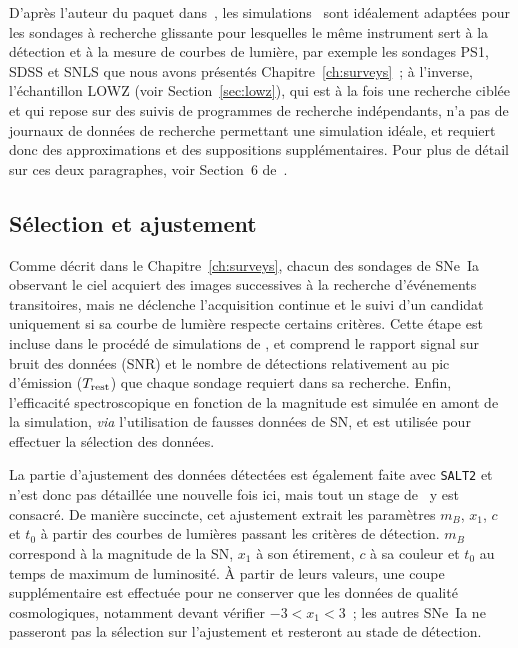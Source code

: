 \documentclass[../main/main.tex]{subfiles}
\begin{document}
D'après l'auteur du paquet dans~\cite{kessler2019}, les simulations \snana\ sont
idéalement adaptées pour les sondages à recherche glissante pour lesquelles le
même instrument sert à la détection et à la mesure de courbes de lumière, par
exemple les sondages PS1, SDSS et SNLS que nous avons présentés
Chapitre~\ref{ch:surveys}~; à l'inverse, l'échantillon LOWZ (voir
Section~\ref{sec:lowz}), qui est à la fois une recherche ciblée et qui repose
sur des suivis de programmes de recherche indépendants, n'a pas de journaux de
données de recherche permettant une simulation idéale, et requiert donc des
approximations et des suppositions supplémentaires. Pour plus de détail sur ces
deux paragraphes, voir Section~6 de~\cite{kessler2019}.

\subsection{Sélection et ajustement}\label{ssec:simdetec}

Comme décrit dans le Chapitre~\ref{ch:surveys}, chacun des sondages de SNe~Ia
observant le ciel acquiert des images successives à la recherche d'événements
transitoires, mais ne déclenche l'acquisition continue et le suivi d'un candidat
uniquement si sa courbe de lumière respecte certains critères. Cette étape est
incluse dans le procédé de simulations de \snana, et comprend le rapport signal
sur bruit des données (SNR) et le nombre de détections relativement au pic
d'émission ($T_{\rm rest}$) que chaque sondage requiert dans sa recherche.
Enfin, l'efficacité spectroscopique en fonction de la magnitude est simulée en
amont de la simulation, \textit{via} l'utilisation de fausses données de SN, et
est utilisée pour effectuer la sélection des données.

La partie d'ajustement des données détectées est également faite avec
\texttt{SALT2} et n'est donc pas détaillée une nouvelle fois ici, mais tout un
stage de \snana\ y est consacré. De manière succincte, cet ajustement extrait
les paramètres $m_B$, $x_1$, $c$ et $t_0$ à partir des courbes de lumières
passant les critères de détection. $m_B$ correspond à la magnitude de la SN,
$x_1$ à son étirement, $c$ à sa couleur et $t_0$ au temps de maximum de
luminosité. À partir de leurs valeurs, une coupe supplémentaire est effectuée
pour ne conserver que les données de qualité cosmologiques, notamment devant
vérifier $-3 < x_1 < 3$~; les autres SNe~Ia ne passeront pas la sélection sur
l'ajustement et resteront au stade de détection.
\end{document}
